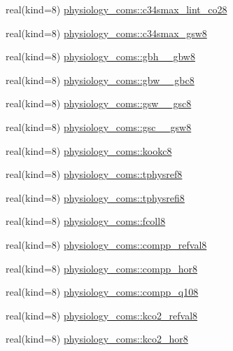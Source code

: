 \begin{DoxyCompactItemize}
\item 
real(kind=8) \hyperlink{namespacephysiology__coms_a5737cc18585ebecb1f7ece2f7ec958b8}{physiology\+\_\+coms\+::c34smax\+\_\+lint\+\_\+co28}
\item 
real(kind=8) \hyperlink{namespacephysiology__coms_a0b21762b30a4dd9c6ca8216a7715c201}{physiology\+\_\+coms\+::c34smax\+\_\+gsw8}
\item 
real(kind=8) \hyperlink{namespacephysiology__coms_a8033820f67ad5288fa97726389f23458}{physiology\+\_\+coms\+::gbh\+\_\+\_\+gbw8}
\item 
real(kind=8) \hyperlink{namespacephysiology__coms_a77738c2bf4d08792c7282d50bcc53e3b}{physiology\+\_\+coms\+::gbw\+\_\+\_\+gbc8}
\item 
real(kind=8) \hyperlink{namespacephysiology__coms_a2771271aa4821d7ed40fc8f23355493f}{physiology\+\_\+coms\+::gsw\+\_\+\_\+gsc8}
\item 
real(kind=8) \hyperlink{namespacephysiology__coms_af804dfc5ca14c4ad970da65bbca13da1}{physiology\+\_\+coms\+::gsc\+\_\+\_\+gsw8}
\item 
real(kind=8) \hyperlink{namespacephysiology__coms_a284346103ccac25fdc1838c75b54b8e9}{physiology\+\_\+coms\+::kookc8}
\item 
real(kind=8) \hyperlink{namespacephysiology__coms_aa0924691938da817d9f145194aee16df}{physiology\+\_\+coms\+::tphysref8}
\item 
real(kind=8) \hyperlink{namespacephysiology__coms_aedf008fa411936b174aa5146e5191596}{physiology\+\_\+coms\+::tphysrefi8}
\item 
real(kind=8) \hyperlink{namespacephysiology__coms_a2a54f0b36ae44053e7e2d10471c8d70e}{physiology\+\_\+coms\+::fcoll8}
\item 
real(kind=8) \hyperlink{namespacephysiology__coms_aa9a6bcd403111bab8c6e39fa15502d08}{physiology\+\_\+coms\+::compp\+\_\+refval8}
\item 
real(kind=8) \hyperlink{namespacephysiology__coms_a557bf385ff4d0c1e66bbfe91c48d61a9}{physiology\+\_\+coms\+::compp\+\_\+hor8}
\item 
real(kind=8) \hyperlink{namespacephysiology__coms_ad3ea019b7bf4d9cc4e80e993726b56dc}{physiology\+\_\+coms\+::compp\+\_\+q108}
\item 
real(kind=8) \hyperlink{namespacephysiology__coms_a58bf1152a5e8f0a3a8943f94d9fdb462}{physiology\+\_\+coms\+::kco2\+\_\+refval8}
\item 
real(kind=8) \hyperlink{namespacephysiology__coms_a14104de29446380b41c6de1e3960e1b1}{physiology\+\_\+coms\+::kco2\+\_\+hor8}

\end{DoxyCompactItemize}
